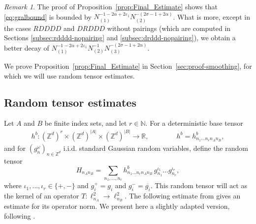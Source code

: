 \documentclass[11pt, xcolor = dvipsnames,reqno
]{amsart}
\theoremstyle{definition}
\theoremstyle{remark}
\newtheorem{rmk}[thm]{Remark}
\begin{document}
\begin{rmk}
The proof of Proposition~\ref{prop:Final_Estimate} shows that \eqref{eq:gralbound} is bounded by $N_{(1)}^{-1-2\alpha+2\varepsilon_1} N_{(2)}^{-(2\sigma - 1 + 2\alpha)}$. What is more, except in the cases $RDDDD$ and $DRDDD$ without pairings (which are computed in Sections \ref{subsec:rdddd-nopairing} and \ref{subsec:drddd-nopairing}), we obtain a better decay of $N_{(1)}^{-1-2\alpha+2\varepsilon_1} N_{(2)}^{-1} N_{(3)}^{-(2\sigma - 1 + 2\alpha)}$.
\end{rmk}

We prove Proposition~\ref{prop:Final_Estimate} in Section~\ref{sec:proof-smoothing}, for which we will use random tensor estimates.




\subsection{Random tensor estimates}
\label{subsec:rt}

Let $A$ and $B$ be finite index sets, and let $r \in \mathbb{N}$. For a deterministic base tensor 
\begin{align}
    h^b : (\mathbb Z^d)^r \times  (\mathbb Z^d)^{|A|} \times (\mathbb Z^d)^{|B|} \to \mathbb R, 
    \qquad \qquad h^b = h^b_{n_1\ldots n_rn_An_B}, 
\end{align}
and for $(g_n^{\omega})_{n \in \mathbb Z^d}$ i.i.d. standard Gaussian random variables, define the random tensor
    \begin{equation}\label{eq:randomop-gral}
        H_{n_An_B} = \sum_{n_1, \ldots, n_r} h^b_{n_1\ldots n_rn_An_B} \,  g_{n_1}^{\iota_1} \ldots g_{n_r}^{\iota_r}, 
    \end{equation}
where $\iota_1, \ldots, \iota_r \in \{+,-\}$ and $g_i^+ = g_i$ and $g_i^- = \overline{g_i}$. 
This random tensor will act as the kernel of an operator $T: \ell^2_{n_A} \to \ell^2_{n_B}$.
The following estimate from \cite[Proposition 4.14]{DNY2022} gives an estimate for its operator norm. We present here a slightly adapted version, following \cite{Kaneshiro2025}.
\end{document}
